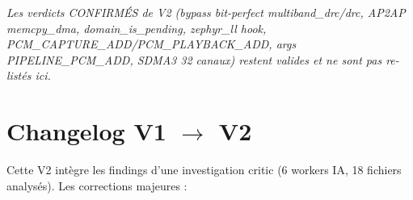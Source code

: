 \documentclass[11pt,a4paper]{article}
\begin{document}
\textit{Les verdicts CONFIRMÉS de V2 (bypass bit-perfect multiband\_drc/drc, AP2AP memcpy\_dma, domain\_is\_pending, zephyr\_ll hook, PCM\_CAPTURE\_ADD/PCM\_PLAYBACK\_ADD, args PIPELINE\_PCM\_ADD, SDMA3 32 canaux) restent valides et ne sont pas re-listés ici.}

\clearpage

\section*{Changelog V1 $\rightarrow$ V2}

Cette V2 intègre les findings d'une investigation critic (6 workers IA, 18 fichiers analysés). Les corrections majeures :
\end{document}
